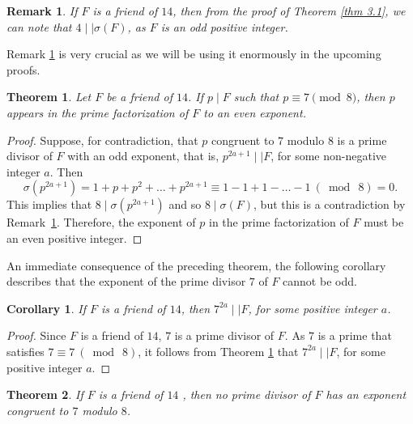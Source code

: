 \documentclass[11pt,twoside]{amsart}
\newtheorem{theorem}{Theorem}[section]
\newtheorem{corollary}{Corollary}[section]
\newtheorem{remark}{Remark}[section]
\begin{document}
\begin{remark}\label{rem3.1}
If $F$ is a friend of $14$, then from the proof of Theorem \ref{thm 3.1}, we can note that $4\mid\mid\sigma(F)$, as $F$ is an odd positive integer.
\end{remark}

\medskip

Remark \ref{rem3.1} is very crucial as we will be using it enormously in the upcoming proofs.

\medskip

\begin{theorem}\label{thm 3.2}
Let $F$ be a friend of $14$. If $p\mid F$ such that $p\equiv 7 \pmod 8$, then $p$ appears in the prime factorization of $F$ to an even exponent.    
\end{theorem}
\begin{proof}
Suppose, for contradiction, that $p$ congruent to $7$ modulo $8$ is a prime divisor of $F$ with an odd exponent, that is, $p^{2a+1}\mid\mid F$, for some non-negative integer $a$. Then
$$\sigma(p^{2a+1})=1+p+p^2+\dots+p^{2a+1}\equiv 1-1+1 - \dots-1 \ (\bmod \ 8) =0.$$
This implies that $8\mid \sigma(p^{2a+1})$ and so $8\mid \sigma(F)$, but this is a contradiction by Remark~\ref{rem3.1}. Therefore, the exponent of $p$ in the prime factorization of $F$ must be an even positive integer.
\end{proof}

\smallskip

An immediate consequence of the preceding theorem, the following corollary describes that the exponent of the prime divisor $7$ of $F$ cannot be odd.

\smallskip

\begin{corollary}
If $F$ is a friend of $14$, then $7^{2a}\mid\mid F$, for some positive integer $a$.  
\end{corollary}
\begin{proof}
Since $F$ is a friend of $14$, $7$ is a prime divisor of $F$. As $7$ is a prime that satisfies \linebreak $7\equiv7~(\bmod~8)$, it follows from Theorem \ref{thm 3.2} that  $7^{2a}\mid\mid F$, for some positive integer $a$.
\end{proof}

\begin{theorem}
If $F$ is a friend of $14$ , then no prime divisor of $F$ has an exponent congruent to $7$ modulo $8$.
\end{theorem}
\end{document}

